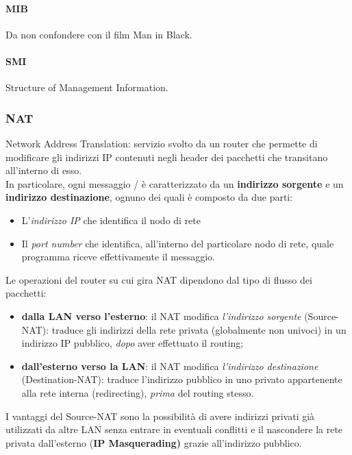 \documentclass[a4paper,11pt]{article}
\def\subsub#1{\subsubsection{#1}\label{#1}}
\def\para#1{\paragraph{#1}\label{#1}}
\def\vedi#1{\nameref{#1}}
\begin{document}
\para{MIB} Da non confondere con il film Man in Black.
\para{SMI} Structure of Management Information.
\subsub{NAT}
Network Address Translation: servizio svolto da un router che permette di modificare gli indirizzi IP contenuti negli header dei pacchetti che transitano all'interno di esso.\\
 In particolare, ogni messaggio \vedi{TCP}/\vedi{IP} è caratterizzato da un \textbf{indirizzo sorgente} e un \textbf{indirizzo destinazione}, ognuno dei quali è composto da due parti:
 \begin{itemize}
 	\item L'\textit{indirizzo IP} che identifica il nodo di rete
 	\item Il \textit{port number} che identifica, all’interno del particolare nodo di rete, quale programma riceve effettivamente il messaggio.
 \end{itemize}
Le operazioni del router su cui gira NAT dipendono dal tipo di flusso dei pacchetti:
\begin{itemize}
\item \textbf{dalla LAN verso l'esterno}: il NAT modifica \textit{l'indirizzo sorgente} (Source-NAT): traduce gli indirizzi della rete privata (globalmente non univoci) in un indirizzo IP pubblico, \textit{dopo} aver effettuato il routing;
\item \textbf{dall'esterno verso la LAN}: il NAT modifica  \textit{l'indirizzo destinazione} (Destination-NAT): traduce l'indirizzo pubblico in uno privato appartenente alla rete interna (redirecting), \textit{prima} del routing stesso.
\end{itemize}
I vantaggi del Source-NAT sono la possibilità di avere indirizzi privati già utilizzati da altre LAN senza entrare in eventuali conflitti e il nascondere la rete privata dall'esterno (\textbf{IP Masquerading)} grazie all'indirizzo pubblico.
 
\end{document}
